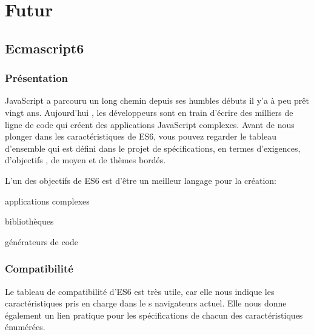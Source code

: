 \chapter{Futur}

\section{Ecmascript6}
\label{ch:ecmascript6}

\subsection{Présentation}


JavaScript a parcouru un long chemin depuis ses humbles débuts il y’a à peu prêt vingt ans. Aujourd’hui , les développeurs sont en train d’écrire des milliers de ligne de code qui créent des applications JavaScript complexes. Avant de nous plonger dans les caractéristiques de ES6, vous pouvez regarder le tableau d’ensemble qui est défini dans le projet de spécifications, en termes d'exigences, d’objectifs , de moyen et de thèmes bordés.

L’un des objectifs de ES6 est d’être un meilleur langage pour la création:


\begin{list}{•}{}
  \item 
  applications complexes
  \item
  bibliothèques
  \item
  générateurs de code
\end{list}

\subsection {Compatibilité}

Le tableau de compatibilité  d’ES6 est très utile, car elle nous indique les caractéristiques pris en charge dans le s navigateurs actuel. Elle nous donne également un lien pratique pour les spécifications de chacun des caractéristiques énumérées.

